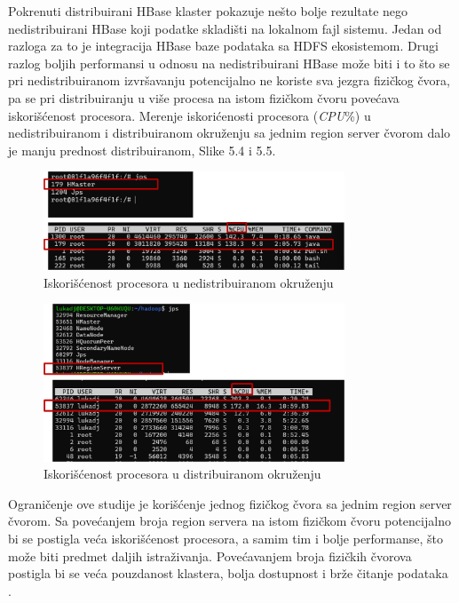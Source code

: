 \documentclass[12pt,oneside]{memoir}
\begin{document}
Pokrenuti distribuirani HBase klaster pokazuje nešto bolje rezultate nego nedistribuirani HBase koji podatke skladišti na lokalnom fajl sistemu. Jedan od razloga za to je integracija HBase baze podataka sa HDFS ekosistemom\cite{hbaseGuide}.  Drugi razlog boljih performansi u odnosu na nedistribuirani HBase može biti i to što se pri nedistribuiranom izvršavanju potencijalno ne koriste sva jezgra fizičkog čvora, pa se pri distribuiranju u više procesa na istom fizičkom čvoru povećava iskorišćenost procesora. Merenje iskorićenosti procesora (\textit{CPU}\%) u nedistribuiranom i distribuiranom okruženju sa jednim region server čvorom dalo je manju prednost distribuiranom, Slike 5.4 i 5.5. 

\begin{figure}[!ht]
  \centering
  \includegraphics[width=0.8\textwidth]{nedistribuiro-cpu.png}
  \caption{Iskorišćenost procesora u nedistribuiranom okruženju}
  \label{fig:grafikon}
\end{figure}


\begin{figure}[!ht]
  \centering
  \includegraphics[width=0.8\textwidth]{distribuirano-cpu.png}
  \caption{Iskorišćenost procesora u distribuiranom okruženju}
  \label{fig:grafikon}
\end{figure}

\pagebreak 
Ograničenje ove studije je korišćenje jednog fizičkog čvora sa jednim region server čvorom. Sa povećanjem broja region servera na istom fizičkom čvoru potencijalno bi se postigla veća iskorišćenost procesora, a samim tim i bolje performanse, što može biti predmet daljih istraživanja. Povećavanjem broja fizičkih čvorova postigla bi se veća pouzdanost klastera, bolja dostupnost i brže čitanje podataka \cite{ColumnarOriented}.  
\end{document}
